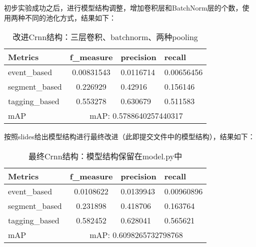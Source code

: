 \documentclass[]{ctexart}
\begin{document}
初步实验成功之后，进行模型结构调整，增加卷积层和BatchNorm层的个数，使用两种不同的池化方式，结果如下：
\begin{table}[ht]
    \centering
    \begin{tabular}{|l|cll|}
    \hline
    Metrics        & \multicolumn{1}{c|}{f\_measure} & \multicolumn{1}{l|}{precision}  & recall     \\ \hline
    event\_based   & \multicolumn{1}{c|}{0.00831543} & \multicolumn{1}{l|}{0.0116714}  & 0.00656456 \\ \hline
    segment\_based & \multicolumn{1}{c|}{0.226929}   & \multicolumn{1}{l|}{0.42916}    & 0.156146   \\ \hline
    tagging\_based & \multicolumn{1}{c|}{0.553278}   & \multicolumn{1}{l|}{0.630679}   & 0.511583   \\ \hline
    mAP            & \multicolumn{3}{c|}{mAP: 0.5788640257440317}                                        \\ \hline
    \end{tabular}
    \caption{改进Crnn结构：三层卷积、batchnorm、两种pooling}
    \label{exp2}
\end{table}

\newpage
按照slides给出模型结构进行最终改进（此即提交文件中的模型结构），结果如下：
\begin{table}[ht]
    \centering
    \begin{tabular}{|l|cll|}
    \hline
    Metrics        & \multicolumn{1}{c|}{f\_measure} & \multicolumn{1}{l|}{precision}  & recall     \\ \hline
    event\_based   & \multicolumn{1}{c|}{0.0108622}  & \multicolumn{1}{l|}{0.0139943}  & 0.00960896 \\ \hline
    segment\_based & \multicolumn{1}{c|}{0.231898}   & \multicolumn{1}{l|}{0.418706}   & 0.163764   \\ \hline
    tagging\_based & \multicolumn{1}{c|}{0.582452}   & \multicolumn{1}{l|}{0.628041}   & 0.565621   \\ \hline
    mAP            & \multicolumn{3}{c|}{mAP: 0.6098265732798768}                                        \\ \hline
    \end{tabular}
    \caption{最终Crnn结构：模型结构保留在model.py中}
    \label{exp3}
\end{table}
\end{document}

